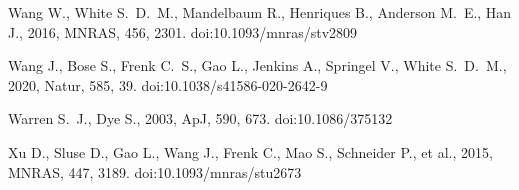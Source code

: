\documentclass[a4paper, fleqn, usenatbib, useAMS]{mnras}
\begin{document}
\begin{thebibliography}{99}
 Wang W., White S.~D.~M., Mandelbaum R., Henriques B., Anderson M.~E., Han J., 2016, MNRAS, 456, 2301. doi:10.1093/mnras/stv2809


 Wang J., Bose S., Frenk C.~S., Gao L., Jenkins A., Springel V., White S.~D.~M., 2020, Natur, 585, 39. doi:10.1038/s41586-020-2642-9


 Warren S.~J., Dye S., 2003, ApJ, 590, 673. doi:10.1086/375132

 Xu D., Sluse D., Gao L., Wang J., Frenk C., Mao S., Schneider P., et al., 2015, MNRAS, 447, 3189. doi:10.1093/mnras/stu2673









\end{thebibliography}
\bsp	%
\label{lastpage}
\end{document}
